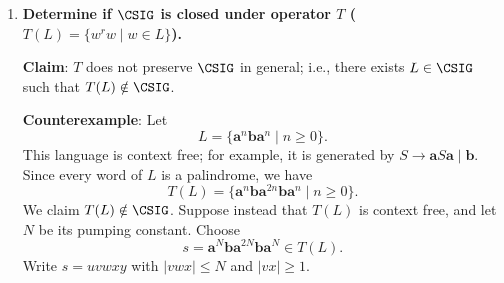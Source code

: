 \begin{enumerate}[{9.}1. ]
\textbf{Proof}: We prove a stronger statement: for every nonterminal
$A\in\Omega$ and every terminal string $x\in\Sigma^*$,
\[
A\DRightarrow_G^* x \quad\Longleftrightarrow\quad A\DRightarrow_{G^r}^* x^r.
\]

We prove the forward implication by induction on the derivation length of
$A\DRightarrow_G^* x$.

\textbf{Base}: If the derivation has one step, then $A\to x$ is a production of
$G$.  By definition, $A\to x^r$ is a production of $G^r$, so
$A\DRightarrow_{G^r} x^r$.

\textbf{Step}: Suppose the first production is
\[
A\to X_1X_2\cdots X_k
\]
in $G$, where each $X_i$ is either a terminal or a nonterminal, and suppose the
rest of the derivation yields
\[
X_1X_2\cdots X_k \DRightarrow_G^* x_1x_2\cdots x_k = x,
\]
where each $x_i$ is the terminal string ultimately produced from $X_i$
(possibly a single terminal if $X_i\in\Sigma$).  By the induction hypothesis,
each nonterminal $X_i$ derives $x_i^r$ in $G^r$, while terminals already equal
their own one-letter reversals.  Since $G^r$ contains the production
\[
A\to X_kX_{k-1}\cdots X_1,
\]
we obtain
\[
A \Rightarrow_{G^r} X_kX_{k-1}\cdots X_1 \DRightarrow_{G^r}^*
x_k^r x_{k-1}^r \cdots x_1^r = (x_1x_2\cdots x_k)^r = x^r.
\]

Conversely, suppose $x^r\in L(G^r)$. Applying the forward implication to the
reversed grammar $G^r$, and using $(G^r)^r=G$, gives $x\in L(G)$. Taking
$A=S$, we conclude that
\[
x\in L(G) \quad\Longleftrightarrow\quad x^r\in L(G^r),
\]
so $L(G^r)=L^r$. \qed

\item \textbf{Determine if $\CSIG$ is closed under operator $T$ ($T(L) = \{w^r w \mid w \in L\}$).}

\textbf{Claim}: $T$ does not preserve $\CSIG$ in general; i.e., there exists $L\in\CSIG$ such that $T(L)\notin\CSIG$.

\textbf{Counterexample}: Let
\[
L=\{\pmb{a}^n\pmb{b}\pmb{a}^n\mid n\geq 0\}.
\]
This language is context free; for example, it is generated by
$S\to\pmb{a}S\pmb{a}\mid\pmb{b}$.  Since every word of $L$ is a palindrome, we
have
\[
T(L)=\{\pmb{a}^n\pmb{b}\pmb{a}^{2n}\pmb{b}\pmb{a}^n\mid n\geq 0\}.
\]
We claim $T(L)\notin\CSIG$.  Suppose instead that $T(L)$ is context free, and
let $N$ be its pumping constant.  Choose
\[
s=\pmb{a}^N\pmb{b}\pmb{a}^{2N}\pmb{b}\pmb{a}^N \in T(L).
\]
Write $s=uvwxy$ with $|vwx|\leq N$ and $|vx|\geq 1$.


\end{enumerate}

